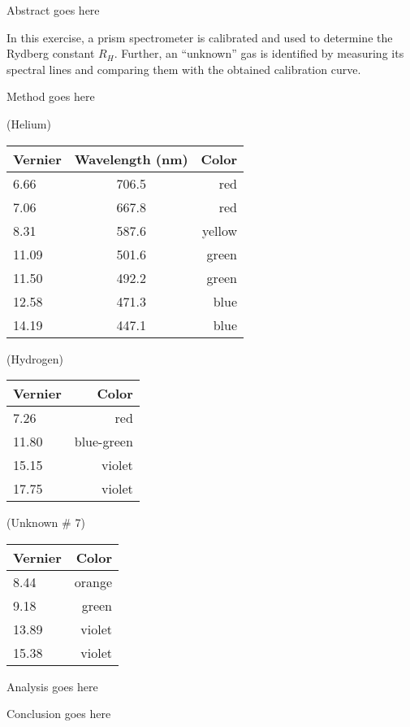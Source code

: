 
\physics

\begin{paperabs}
Abstract goes here
\end{paperabs}

\begin{paper}

In this exercise, a prism spectrometer is calibrated and used to determine the Rydberg constant \( R_H \). Further, an ``unknown'' gas is identified by measuring its spectral lines and comparing them with the obtained calibration curve. 


Method goes here


(Helium)

\begin{tabular}{|l|c|r|}
	\hline
	Vernier & Wavelength (nm) & Color \\ \hline
	6.66 & 706.5 & red \\ \hline
	7.06 & 667.8 & red \\ \hline
	8.31 & 587.6 & yellow \\ \hline
	11.09 & 501.6 & green \\ \hline
	11.50 & 492.2 & green \\ \hline
	12.58 & 471.3 & blue \\ \hline
	14.19 & 447.1 & blue \\ \hline
\end{tabular}

(Hydrogen)

\begin{tabular}{|l|r|}
	\hline
	Vernier & Color \\ \hline
	7.26 & red \\ \hline
	11.80 & blue-green \\ \hline
	15.15 & violet \\ \hline
	17.75 & violet \\ \hline
\end{tabular}

(Unknown \# 7)

\begin{tabular}{|l|r|}
	\hline
	Vernier & Color \\ \hline
	8.44 & orange \\ \hline
	9.18 & green \\ \hline
	13.89 & violet \\ \hline
	15.38 & violet \\ \hline
\end{tabular}


Analysis goes here


Conclusion goes here
\end{paper}
